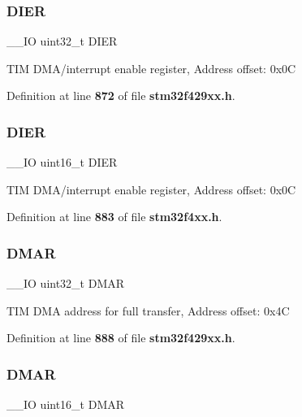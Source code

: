 \subsubsection{D\+I\+ER\hspace{0.1cm}{\footnotesize\ttfamily [1/2]}}
{\footnotesize\ttfamily \+\_\+\+\_\+\+IO uint32\+\_\+t D\+I\+ER}

T\+IM D\+M\+A/interrupt enable register, Address offset\+: 0x0C 

Definition at line \textbf{ 872} of file \textbf{ stm32f429xx.\+h}.

\mbox{\label{structTIM__TypeDef_a1481b34cc41018c17e4ab592a1c8cb55}} 
\subsubsection{D\+I\+ER\hspace{0.1cm}{\footnotesize\ttfamily [2/2]}}
{\footnotesize\ttfamily \+\_\+\+\_\+\+IO uint16\+\_\+t D\+I\+ER}

T\+IM D\+M\+A/interrupt enable register, Address offset\+: 0x0C 

Definition at line \textbf{ 883} of file \textbf{ stm32f4xx.\+h}.

\mbox{\label{structTIM__TypeDef_ab9087f2f31dd5edf59de6a59ae4e67ae}} 
\subsubsection{D\+M\+AR\hspace{0.1cm}{\footnotesize\ttfamily [1/2]}}
{\footnotesize\ttfamily \+\_\+\+\_\+\+IO uint32\+\_\+t D\+M\+AR}

T\+IM D\+MA address for full transfer, Address offset\+: 0x4C 

Definition at line \textbf{ 888} of file \textbf{ stm32f429xx.\+h}.

\mbox{\label{structTIM__TypeDef_a30c2d8aa9c76dfba0b9a378b64700bda}} 
\subsubsection{D\+M\+AR\hspace{0.1cm}{\footnotesize\ttfamily [2/2]}}
{\footnotesize\ttfamily \+\_\+\+\_\+\+IO uint16\+\_\+t D\+M\+AR}

